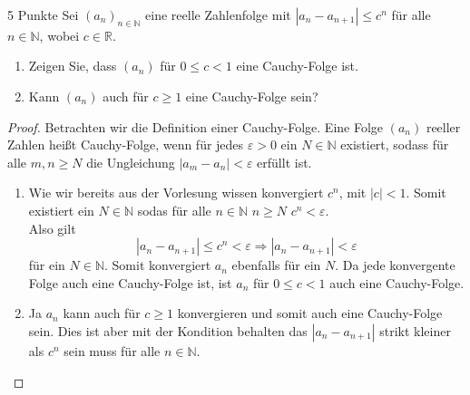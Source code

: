 \documentclass{../problemset}
\begin{document}
\begin{problem}{5 Punkte}
Sei $(a_n)_{n\in\mathbb{N}}$ eine reelle Zahlenfolge mit $|a_n - a_{n+1}| \leq c^n$ für alle $n \in \mathbb{N}$, wobei $c \in \mathbb{R}$.
\begin{enumerate}
	\item Zeigen Sie, dass $(a_n)$ für $0 \leq c < 1$ eine Cauchy-Folge ist.
	\item Kann $(a_n)$ auch für $c \geq 1$ eine Cauchy-Folge sein?
\end{enumerate}
\begin{proof}
	Betrachten wir die Definition einer Cauchy-Folge.
	Eine Folge $(a_n)$ reeller Zahlen heißt Cauchy-Folge, wenn für jedes $\varepsilon > 0$ ein $N \in \mathbb{N}$ existiert,
	sodass für alle $m, n \geq N$ die Ungleichung $|a_m - a_n| < \varepsilon$ erfüllt ist.

	\begin{enumerate}
		\item Wie wir bereits aus der Vorlesung wissen konvergiert $c^n$, mit $|c| < 1$.
		      Somit existiert ein $N \in \mathbb{N}$ sodas für alle $n \in \mathbb{N}$ $n \ge N$ $c^n < \varepsilon$. \\
		      Also gilt \[
			      |a_n - a_{n+1}| \leq c^n < \varepsilon \Longrightarrow |a_n - a_{n+1}| < \varepsilon
		      \] für ein $N \in \mathbb{N}$. Somit konvergiert $a_n$ ebenfalls für ein $N$.
		      Da jede konvergente Folge auch eine Cauchy-Folge ist, ist $a_n$ für $0 \leq c < 1$ auch eine Cauchy-Folge.
		\item Ja $a_n$ kann auch für $c \ge 1$ konvergieren und somit auch eine Cauchy-Folge sein.
		      Dies ist aber mit der Kondition behalten das $|a_n - a_{n+1}|$ strikt kleiner als $c^n$ sein muss für alle $n \in \mathbb{N}$.
	\end{enumerate}
\end{proof}

\end{problem}
\end{document}
